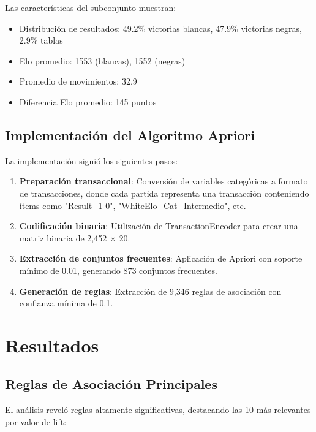 \documentclass[runningheads]{llncs}
\begin{document}
Las características del subconjunto muestran:
\begin{itemize}
\item Distribución de resultados: 49.2\% victorias blancas, 47.9\% victorias negras, 2.9\% tablas
\item Elo promedio: 1553 (blancas), 1552 (negras)
\item Promedio de movimientos: 32.9
\item Diferencia Elo promedio: 145 puntos
\end{itemize}

\subsection{Implementación del Algoritmo Apriori}

La implementación siguió los siguientes pasos:

\begin{enumerate}
\item \textbf{Preparación transaccional}: Conversión de variables categóricas a formato de transacciones, donde cada partida representa una transacción conteniendo ítems como "Result\_1-0", "WhiteElo\_Cat\_Intermedio", etc.

\item \textbf{Codificación binaria}: Utilización de TransactionEncoder para crear una matriz binaria de 2,452 × 20.

\item \textbf{Extracción de conjuntos frecuentes}: Aplicación de Apriori con soporte mínimo de 0.01, generando 873 conjuntos frecuentes.

\item \textbf{Generación de reglas}: Extracción de 9,346 reglas de asociación con confianza mínima de 0.1.
\end{enumerate}

\section{Resultados}

\subsection{Reglas de Asociación Principales}

El análisis reveló reglas altamente significativas, destacando las 10 más relevantes por valor de lift:
\end{document}
